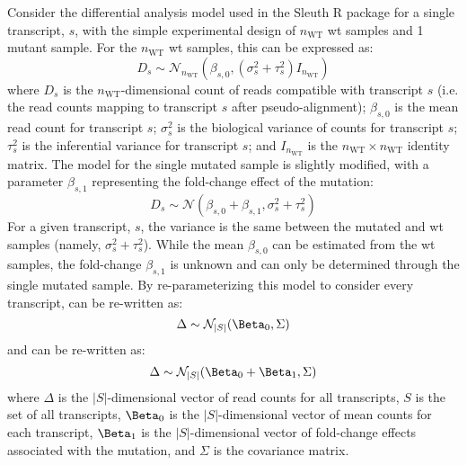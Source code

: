 Consider the differential analysis model used in the Sleuth R package \cite{pimentelDifferentialAnalysisRNAseq2017,yiGenelevelDifferentialAnalysis2018} for a single transcript, $s$, with the simple experimental design of $n_\mathrm{WT}$ \gls{wt} samples and 1 mutant sample.
For the $n_\mathrm{WT}$ \gls{wt} samples, this can be expressed as:
%
\begin{equation}
  D_s \sim \mathcal{N}_{n_\mathrm{WT}} \left( \beta_{s,0}, (\sigma_s^2 + \tau_s^2)I_{n_\mathrm{WT}} \right)
  \label{eqn:wt_model}
\end{equation}
%
where $D_s$ is the $n_\mathrm{WT}$-dimensional count of reads compatible with transcript $s$ (i.e. the read counts mapping to transcript $s$ after pseudo-alignment); $\beta_{s,0}$ is the mean read count for transcript $s$; $\sigma_s^2$ is the biological variance of counts for transcript $s$; $\tau_s^2$ is the inferential variance for transcript $s$; and $I_{n_\mathrm{WT}}$ is the ${n_\mathrm{WT}} \times {n_\mathrm{WT}}$ identity matrix.
The model for the single mutated sample is slightly modified, with a parameter $\beta_{s,1}$ representing the fold-change effect of the mutation:
%
\begin{equation}
  D_s \sim \mathcal{N} \left( \beta_{s, 0} + \beta_{s, 1}, \sigma_s^2 + \tau_s^2 \right)
  \label{eqn:single_mut_model}
\end{equation}
%
For a given transcript, $s$, the variance is the same between the mutated and \gls{wt} samples (namely, $\sigma_s^2 + \tau_s^2$).
While the mean $\beta_{s, 0}$ can be estimated from the \gls{wt} samples, the fold-change $\beta_{s, 1}$ is unknown and can only be determined through the single mutated sample.
By re-parameterizing this model to consider every transcript,  can be re-written as:
%
\begin{equation}
  \Delta \sim \mathcal{N}_{|S|}(\Beta_0, \Sigma) \\
\end{equation}
%
and  can be re-written as:
%
\begin{equation}
  \Delta \sim \mathcal{N}_{|S|}(\Beta_0 + \Beta_1, \Sigma) \\
\end{equation}
%
where $\Delta$ is the $|S|$-dimensional vector of read counts for all transcripts, $S$ is the set of all transcripts, $\Beta_0$ is the $|S|$-dimensional vector of mean counts for each transcript, $\Beta_1$ is the $|S|$-dimensional vector of fold-change effects associated with the mutation, and $\Sigma$ is the covariance matrix.
